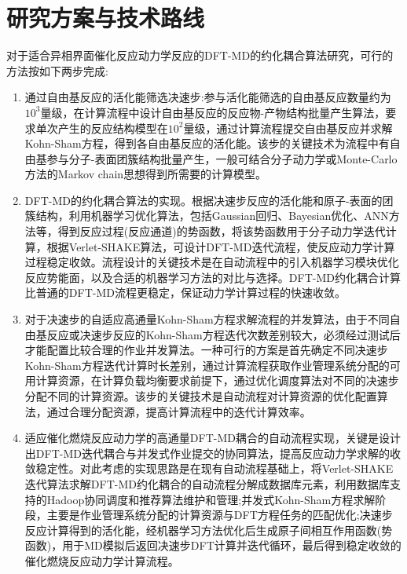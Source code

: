 \section{研究方案与技术路线}
对于适合异相界面催化反应动力学反应的DFT-MD的约化耦合算法研究，可行的方法按如下两步完成:
\begin{enumerate}
	\item 通过自由基反应的活化能筛选决速步:参与活化能筛选的自由基反应数量约为$10^3$量级，在计算流程中设计自由基反应的反应物-产物结构批量产生算法，要求单次产生的反应结构模型在$10^2$量级，通过计算流程提交自由基反应并求解\textrm{Kohn-Sham}方程，得到各自由基反应的活化能。该步的关键技术为流程中有自由基参与分子-表面团簇结构批量产生，一般可结合分子动力学或\textrm{Monte-Carlo}方法的\textrm{Markov chain}思想得到所需要的计算模型。
	\item \textrm{DFT-MD}的约化耦合算法的实现。根据决速步反应的活化能和原子-表面的团簇结构，利用机器学习优化算法，包括\textrm{Gaussian}回归、\textrm{Bayesian}优化、\textrm{ANN}方法等，得到反应过程(反应通道)的势函数，将该势函数用于分子动力学迭代计算，根据\textrm{Verlet-SHAKE}算法，可设计\textrm{DFT-MD}迭代流程，使反应动力学计算过程稳定收敛。流程设计的关键技术是在自动流程中的引入机器学习模块优化反应势能面，以及合适的机器学习方法的对比与选择。\textrm{DFT-MD}约化耦合计算比普通的\textrm{DFT-MD}流程更稳定，保证动力学计算过程的快速收敛。
	\item 对于决速步的自适应高通量\textrm{Kohn-Sham}方程求解流程的并发算法，由于不同自由基反应或决速步反应的\textrm{Kohn-Sham}方程迭代次数差别较大，必须经过测试后才能配置比较合理的作业并发算法。一种可行的方案是首先确定不同决速步\textrm{Kohn-Sham}方程迭代计算时长差别，通过计算流程获取作业管理系统分配的可用计算资源，在计算负载均衡要求前提下，通过优化调度算法对不同的决速步分配不同的计算资源。该步的关键技术是自动流程对计算资源的优化配置算法，通过合理分配资源，提高计算流程中的迭代计算效率。
	\item 适应催化燃烧反应动力学的高通量\textrm{DFT-MD}耦合的自动流程实现，关键是设计出\textrm{DFT-MD}迭代耦合与并发式作业提交的协同算法，提高反应动力学求解的收敛稳定性。对此考虑的实现思路是在现有自动流程基础上，将\textrm{Verlet-SHAKE}迭代算法求解\textrm{DFT-MD}约化耦合的自动流程分解成数据库元素，利用数据库支持的\textrm{Hadoop}协同调度和推荐算法维护和管理;并发式\textrm{Kohn-Sham}方程求解阶段，主要是作业管理系统分配的计算资源与\textrm{DFT}方程任务的匹配优化;决速步反应计算得到的活化能，经机器学习方法优化后生成原子间相互作用函数(势函数)，用于\textrm{MD}模拟后返回决速步\textrm{DFT}计算并迭代循环，最后得到稳定收敛的催化燃烧反应动力学计算流程。%
\end{enumerate}
